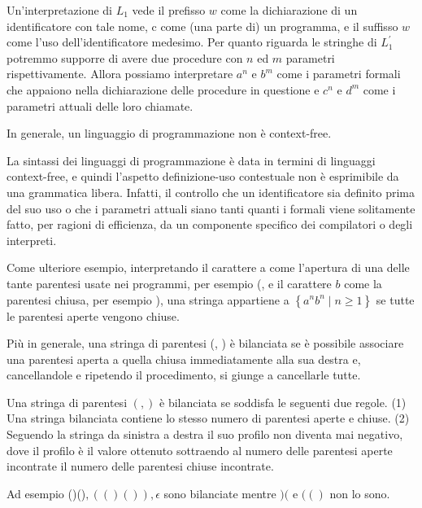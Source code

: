 Un'interpretazione di $L_{1}$ vede il prefisso $w$ come la dichiarazione di un identificatore con tale nome, c come (una parte di) un programma, e il suffisso $w$ come l'uso dell'identificatore medesimo.
Per quanto riguarda le stringhe di $L_{1}^{\prime}$ potremmo supporre di avere due procedure con $n$ ed $m$ parametri rispettivamente. Allora possiamo interpretare $a^{n}$ e $b^{m}$ come i parametri formali che appaiono nella dichiarazione delle procedure in questione e $c^{n}$ e $d^{m}$ come i parametri attuali delle loro chiamate.

\vspace{5mm}

In generale, un linguaggio di programmazione non è
context-free.

La sintassi dei linguaggi di programmazione è data in termini
di linguaggi context-free, e quindi l'aspetto definizione-uso
contestuale non è esprimibile da una grammatica libera.
Infatti, il controllo che un identificatore sia definito prima del
suo uso o che i parametri attuali siano tanti quanti i formali
viene solitamente fatto, per ragioni di efficienza, da un
componente specifico dei compilatori o degli interpreti.

Come ulteriore esempio, interpretando il carattere a come l'apertura di una delle tante parentesi usate nei programmi, per esempio (, e il carattere $b$ come la parentesi chiusa, per esempio ), una stringa appartiene a $\left\{a^{n} b^{n} \mid n \geq 1\right\}$ se tutte le parentesi aperte vengono chiuse.

Più in generale, una stringa di parentesi (, ) è bilanciata se è
possibile associare una parentesi aperta a quella chiusa
immediatamente alla sua destra e, cancellandole e ripetendo il
procedimento, si giunge a cancellarle tutte.

\vspace{5mm}

Una stringa di parentesi $(,)$ è bilanciata se soddisfa le seguenti due regole.
(1) Una stringa bilanciata contiene lo stesso numero di parentesi aperte e chiuse.
(2) Seguendo la stringa da sinistra a destra il suo profilo non diventa mai negativo, dove il profilo è il valore ottenuto sottraendo al numero delle parentesi aperte incontrate il numero delle parentesi chiuse incontrate.

Ad esempio ()()$,(()()), \epsilon$ sono bilanciate mentre $)($ e $(()$ non lo sono.

